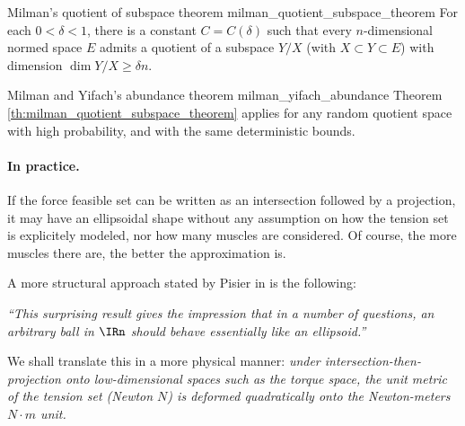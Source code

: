 \begin{theorembox}{Milman's quotient of subspace theorem \cite{artstein-avidanAsymptoticGeometricAnalysis2015}}{milman_quotient_subspace_theorem}
    For each $0<\delta<1$, there is a constant $C = C(\delta)$ such that every $n$-dimensional normed space $E$ admits a quotient of a subspace $Y/X$ (with $X\subset Y\subset E$) with dimension $\dim Y/X \geq \delta n$.
\end{theorembox}

\begin{theorembox}{Milman and Yifach's abundance theorem \cite{milmanRegularRandomSections2021}}{milman_yifach_abundance}
    Theorem \ref{th:milman_quotient_subspace_theorem} applies for any random quotient space with high probability, and with the same deterministic bounds.
\end{theorembox}

\paragraph*{In practice.} If the force feasible set can be written as an intersection followed by a projection, it may have an ellipsoidal shape without any assumption on how the tension set is explicitely modeled, nor how many muscles are considered. Of course, the more muscles there are, the better the approximation is.


A more structural approach stated by Pisier in \cite{pisierVolumeConvexBodies1989} is the following:
\begin{center}
    \emph{``This surprising result gives the impression that in a number of questions, an arbitrary ball in $\IRn$ should behave essentially like an ellipsoid.''}
\end{center}
We shall translate this in a more physical manner: \emph{under intersection-then-projection onto low-dimensional spaces such as the torque space, the unit metric of the tension set (Newton $N$) is deformed quadratically onto the Newton-meters $N\cdot m$ unit.}

